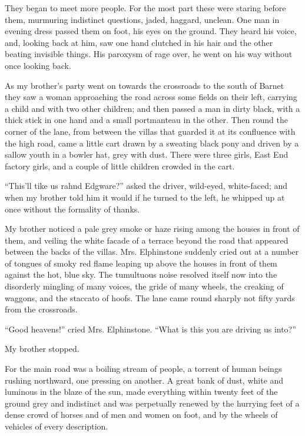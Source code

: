 They began to meet more people. For the most part these were
staring before them, murmuring indistinct questions, jaded,
haggard, unclean. One man in evening dress passed them on foot, his
eyes on the ground. They heard his voice, and, looking back at him,
saw one hand clutched in his hair and the other beating invisible
things. His paroxysm of rage over, he went on his way without once
looking back.

As my brother's party went on towards the crossroads to the south
of Barnet they saw a woman approaching the road across some fields
on their left, carrying a child and with two other children; and
then passed a man in dirty black, with a thick stick in one hand
and a small portmanteau in the other. Then round the corner of the
lane, from between the villas that guarded it at its confluence
with the high road, came a little cart drawn by a sweating black
pony and driven by a sallow youth in a bowler hat, grey with dust.
There were three girls, East End factory girls, and a couple of
little children crowded in the cart.

``This'll tike us rahnd Edgware?'' asked the driver, wild-eyed,
white-faced; and when my brother told him it would if he turned to
the left, he whipped up at once without the formality of thanks.

My brother noticed a pale grey smoke or haze rising among the
houses in front of them, and veiling the white facade of a terrace
beyond the road that appeared between the backs of the villas. Mrs.
Elphinstone suddenly cried out at a number of tongues of smoky red
flame leaping up above the houses in front of them against the hot,
blue sky. The tumultuous noise resolved itself now into the
disorderly mingling of many voices, the gride of many wheels, the
creaking of waggons, and the staccato of hoofs. The lane came round
sharply not fifty yards from the crossroads.

``Good heavens!'' cried Mrs. Elphinstone. ``What is this you are
driving us into?''

My brother stopped.

For the main road was a boiling stream of people, a torrent of
human beings rushing northward, one pressing on another. A great
bank of dust, white and luminous in the blaze of the sun, made
everything within twenty feet of the ground grey and indistinct and
was perpetually renewed by the hurrying feet of a dense crowd of
horses and of men and women on foot, and by the wheels of vehicles
of every description.

